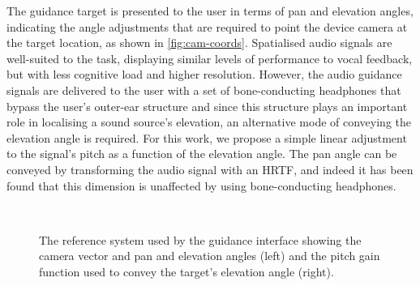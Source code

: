 \documentclass{llncs}
\begin{document}
The guidance target is presented to the user in terms of pan and elevation angles, indicating the angle adjustments that are required to point the device camera at the target location, as shown in \cref{fig:cam-coords}.
Spatialised audio signals are well-suited to the task, displaying similar levels of performance to vocal feedback, but with less cognitive load and higher resolution\cite{klatzky2006cognitive}.
However, the audio guidance signals are delivered to the user with a set of bone-conducting headphones that bypass the user's outer-ear structure and since this structure plays an important role in localising a sound source's elevation\cite{blauert1969sound}, an alternative mode of conveying the elevation angle is required.
For this work, we propose a simple linear adjustment to the signal's pitch as a function of the elevation angle. 
The pan angle can be conveyed by transforming the audio signal with an HRTF, and indeed it has been found that this dimension is unaffected by using bone-conducting headphones\cite{schonstein2008comparison,macdonald2006spatial,stanley2006lateralization}. 

\begin{figure}
  \centering
~
  \caption{The reference system used by the guidance interface showing the camera vector and pan and elevation angles (left) and the pitch gain function used to convey the target's elevation angle (right). }
\end{figure}
\end{document}
